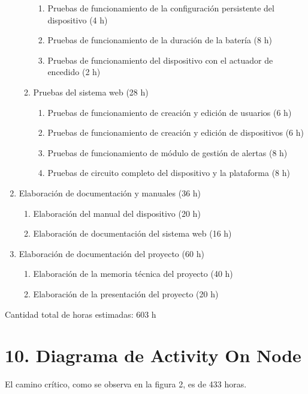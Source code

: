 \documentclass[
11pt, %
]{charter}
\begin{document}
\begin{enumerate}
\begin{enumerate}
\begin{enumerate}
	    \item Pruebas de funcionamiento de la configuración persistente del dispositivo (4 h)	
	    \item Pruebas de funcionamiento de la duración de la batería (8 h)
	    \item Pruebas de funcionamiento del dispositivo con el actuador de encedido (2 h)
	    \end{enumerate}
	\item Pruebas del sistema web (28 h)
	    \begin{enumerate}
	    \item Pruebas de funcionamiento de creación y edición de usuarios (6 h)
	    \item Pruebas de funcionamiento de creación y edición de dispositivos (6 h)
	    \item Pruebas de funcionamiento de módulo de gestión de alertas (8 h)
	    \item Pruebas de circuito completo del dispositivo y la plataforma (8 h)
	    \end{enumerate}
	\end{enumerate}
\item Elaboración de documentación y manuales (36 h)
	\begin{enumerate}
	\item Elaboración del manual del dispositivo (20 h)
	\item Elaboración de documentación del sistema web (16 h)
	\end{enumerate}
\item Elaboración de documentación del proyecto (60 h)
	\begin{enumerate}
	\item Elaboración de la memoria técnica del proyecto (40 h)
	\item Elaboración de la presentación del proyecto (20 h)
	\end{enumerate}
\end{enumerate}

Cantidad total de horas estimadas: 603 h

\section{10. Diagrama de Activity On Node}
\label{sec:AoN}

El camino crítico, como se observa en la figura 2, es de 433 horas.
\end{document}
